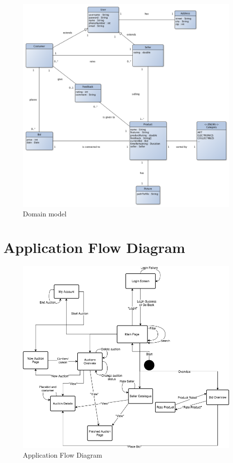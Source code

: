 \begin{figure}[H]
  \caption{Domain model}
  \centering
    \includegraphics[scale=0.38]{figures/domain-diagram.png}
\end{figure}

\section{Application Flow Diagram}

\begin{figure}[H]
    \caption{Application Flow Diagram}
    \centering
    \includegraphics[scale=0.5]{figures/flowchart.png}
\end{figure}


